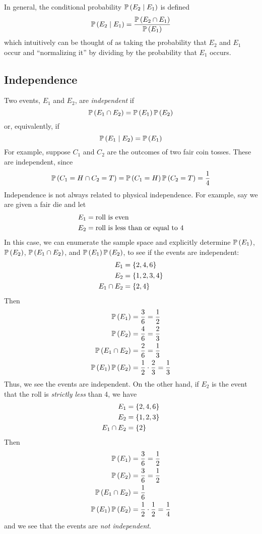 In general, the conditional probability $\operatorname{\mathbb{P}}\left(E_2 \mid E_1\right)$ is defined
\[\operatorname{\mathbb{P}}\left(E_2 \mid E_1\right) = \frac{\operatorname{\mathbb{P}}\left(E_2 \cap E_1\right)}{\operatorname{\mathbb{P}}\left(E_1\right)}\]
which intuitively can be thought of as taking the probability that $E_2$ and
$E_1$ occur and ``normalizing it'' by dividing by the probability that $E_1$
occurs. 

\subsection{Independence}
Two events, $E_1$ and $E_2$, are \emph{independent} if
\[\operatorname{\mathbb{P}}\left(E_1 \cap E_2\right) = \operatorname{\mathbb{P}}\left(E_1\right)\operatorname{\mathbb{P}}\left(E_2\right)\]
or, equivalently, if
\[\operatorname{\mathbb{P}}\left(E_1 \mid E_2\right) = \operatorname{\mathbb{P}}\left(E_1\right)\]
For example, suppose $C_1$ and $C_2$ are the outcomes of two fair coin tosses.
These are independent, since
\[\operatorname{\mathbb{P}}\left(C_1 = H \cap C_2 = T\right) = \operatorname{\mathbb{P}}\left(C_1 = H\right)\operatorname{\mathbb{P}}\left(C_2 = T\right) = \frac{1}{4}\]
Independence is not always related to physical independence. For example, say we
are given a fair die and let
\begin{align*}
    E_1 &= \hbox{roll is even}\\
    E_2 &= \hbox{roll is less than or equal to 4}
\end{align*}
In this case, we can enumerate the sample space and explicitly determine
$\operatorname{\mathbb{P}}\left(E_1\right)$, $\operatorname{\mathbb{P}}\left(E_2\right)$, $\operatorname{\mathbb{P}}\left(E_1 \cap E_2\right)$, and $\operatorname{\mathbb{P}}\left(E_1\right)\operatorname{\mathbb{P}}\left(E_2\right)$,
to see if the events are independent:
\begin{align*}
    E_1 &= \left\lbrace2, 4, 6\right\rbrace\\
    E_2 &= \left\lbrace1, 2, 3, 4\right\rbrace\\
    E_1 \cap E_2 &= \left\lbrace2, 4\right\rbrace
\end{align*}
Then
\begin{align*}
    \operatorname{\mathbb{P}}\left(E_1\right) &= \frac{3}{6} = \frac{1}{2}\\
    \operatorname{\mathbb{P}}\left(E_2\right) &= \frac{4}{6} = \frac{2}{3}\\
    \operatorname{\mathbb{P}}\left(E_1 \cap E_2\right) &= \frac{2}{6} = \frac{1}{3}\\
    \operatorname{\mathbb{P}}\left(E_1\right)\operatorname{\mathbb{P}}\left(E_2\right) &= \frac{1}{2} \cdot \frac{2}{3} = \frac{1}{3}
\end{align*}
Thus, we see the events are independent. On the other hand, if $E_2$ is the
event that the roll is \emph{strictly less} than 4, we have
\begin{align*}
    E_1 &= \left\lbrace2, 4, 6\right\rbrace\\
    E_2 &= \left\lbrace1, 2, 3\right\rbrace\\
    E_1 \cap E_2 &= \left\lbrace2\right\rbrace
\end{align*}
Then
\begin{align*}
    \operatorname{\mathbb{P}}\left(E_1\right) &= \frac{3}{6} = \frac{1}{2}\\
    \operatorname{\mathbb{P}}\left(E_2\right) &= \frac{3}{6} = \frac{1}{2}\\
    \operatorname{\mathbb{P}}\left(E_1 \cap E_2\right) &= \frac{1}{6}\\
    \operatorname{\mathbb{P}}\left(E_1\right)\operatorname{\mathbb{P}}\left(E_2\right) &= \frac{1}{2} \cdot \frac{1}{2} = \frac{1}{4}
\end{align*}
and we see that the events are \emph{not independent}.

